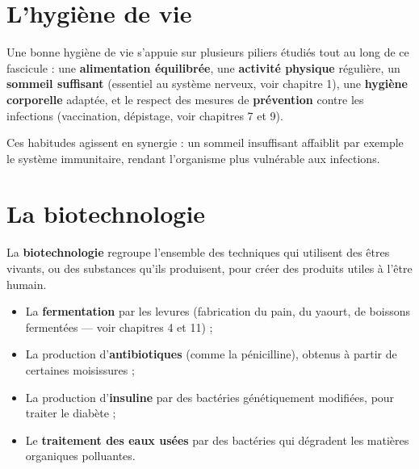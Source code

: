 \section{L'hygiène de vie}

\begin{propriete}
Une bonne hygiène de vie s'appuie sur plusieurs piliers étudiés tout au long de ce
fascicule : une \textbf{alimentation équilibrée}, une \textbf{activité physique}
régulière, un \textbf{sommeil suffisant} (essentiel au système nerveux, voir chapitre 1),
une \textbf{hygiène corporelle} adaptée, et le respect des mesures de \textbf{prévention}
contre les infections (vaccination, dépistage, voir chapitres 7 et 9).
\end{propriete}

\begin{remarque}
Ces habitudes agissent en synergie : un sommeil insuffisant affaiblit par exemple le
système immunitaire, rendant l'organisme plus vulnérable aux infections.
\end{remarque}

\section{La biotechnologie}

\begin{definition}[Biotechnologie]
La \textbf{biotechnologie} regroupe l'ensemble des techniques qui utilisent des êtres
vivants, ou des substances qu'ils produisent, pour créer des produits utiles à l'être
humain.
\end{definition}

\begin{propriete}
\begin{itemize}
\item La \textbf{fermentation} par les levures (fabrication du pain, du yaourt, de
boissons fermentées — voir chapitres 4 et 11) ;
\item La production d'\textbf{antibiotiques} (comme la pénicilline), obtenus à partir
de certaines moisissures ;
\item La production d'\textbf{insuline} par des bactéries génétiquement modifiées, pour
traiter le diabète ;
\item Le \textbf{traitement des eaux usées} par des bactéries qui dégradent les matières
organiques polluantes.
\end{itemize}
\end{propriete}

